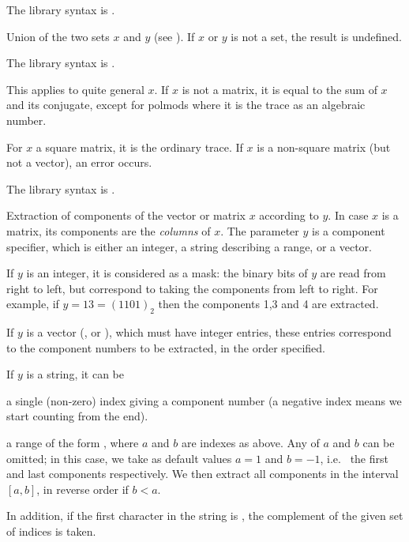 The library syntax is .

\label{se:setunion}
Union of the two sets $x$ and $y$ (see ).
If $x$ or $y$ is not a set, the result is undefined.

The library syntax is .

\label{se:trace}
This applies to quite general $x$. If $x$ is not a
matrix, it is equal to the sum of $x$ and its conjugate, except for polmods
where it is the trace as an algebraic number.

For $x$ a square matrix, it is the ordinary trace. If $x$ is a
non-square matrix (but not a vector), an error occurs.

The library syntax is .

\label{se:vecextract}
Extraction of components of the vector or matrix $x$ according to $y$.
In case $x$ is a matrix, its components are the \emph{columns} of $x$. The
parameter $y$ is a component specifier, which is either an integer, a string
describing a range, or a vector.

If $y$ is an integer, it is considered as a mask: the binary bits of $y$ are
read from right to left, but correspond to taking the components from left to
right. For example, if $y=13=(1101)_2$ then the components 1,3 and 4 are
extracted.

If $y$ is a vector (,  or ), which must have
integer entries, these entries correspond to the component numbers to be
extracted, in the order specified.

If $y$ is a string, it can be

\item a single (non-zero) index giving a component number (a negative
index means we start counting from the end).

\item a range of the form , where $a$ and $b$ are
indexes as above. Any of $a$ and $b$ can be omitted; in this case, we take
as default values $a = 1$ and $b = -1$, i.e.~ the first and last components
respectively. We then extract all components in the interval $[a,b]$, in
reverse order if $b < a$.

In addition, if the first character in the string is \kbd{\pow}, the
complement of the given set of indices is taken.

